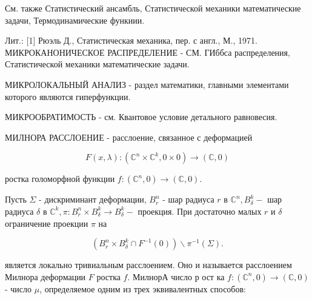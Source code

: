 \documentclass[10pt]{article}
\begin{document}
См. также Статистический ансамбль, Статистической механики математические задачи, Термодинамические функиии.



Лит.: [1] Рюэль Д., Статистическая механика, пер. с англ., М., 1971. МИКРОКАНОНИЧЕСКОЕ РАСПРЕДЕЛЕНИЕ - СМ. ГИббса распределения, Статистической механики математические задачи.



МИКРОЛОКАЛЬНЫЙ АНАЛИЗ - раздел математики, главными элементами которого являются гиперфункции.



МИКРООБРАТИМОСТЬ - см. Квантовое условие детального равновесия.



МИЛНОРА РАССЛОЕНИЕ - расслоение, связанное с деформацией



\[

F(x, \lambda):\left(\mathbb{C}^{n} \times \mathbb{C}^{k}, 0 \times 0\right) \rightarrow(\mathbb{C}, 0)

\]



ростка голоморфной функции $f:\left(\mathbb{C}^{n}, 0\right) \rightarrow(\mathbb{C}, 0)$.



Пусть $\Sigma$ - дискриминант деформации, $B_{r}^{n}$ - шар радиуса $r$ в $\mathbb{C}^{n}, B_{\delta}^{k}-$ шар радиуса $\delta$ в $\mathbb{C}^{k}, \pi: B_{r}^{n} \times B_{\delta}^{k} \rightarrow B_{\delta}^{k}-$ проекция. При достаточно малых $r$ и $\delta$ ограничение проекции $\pi$ на



\[

\left(B_{r}^{n} \times B_{\delta}^{k} \cap F^{-1}(0)\right) \backslash \pi^{-1}(\Sigma) .

\]



является локально тривиальным расслоением. Оно и называется расслоением Милнора деформации $F$ ростка $f$. МилнорА число р ост ка $f:\left(\mathbb{C}^{n}, 0\right) \rightarrow(\mathbb{C}, 0)$ - число $\mu$, определяемое одним из трех эквивалентных способов:
\end{document}
